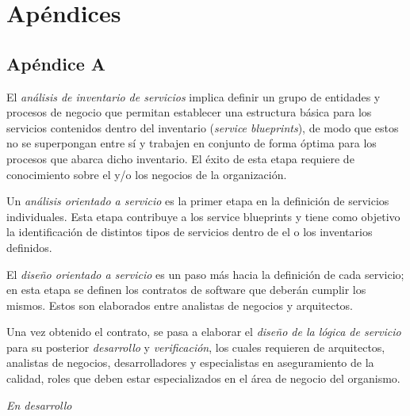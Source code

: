 \chapter{Apéndices}
  \label{Apendices}

  \section{Apéndice A}
    \label{Apendices:ApendiceA}
      El \emph{análisis de inventario de servicios} implica definir un grupo de entidades y procesos de negocio que permitan establecer una estructura básica para los servicios contenidos dentro del inventario (\emph{service blueprints}), de modo que estos no se superpongan entre sí y trabajen en conjunto de forma óptima para los procesos que abarca dicho inventario. El éxito de esta etapa requiere de conocimiento sobre el y/o los negocios de la organización.

      Un \emph{análisis orientado a servicio} es la primer etapa en la definición de servicios individuales. Esta etapa contribuye a los service blueprints y tiene como objetivo la identificación de distintos tipos de servicios dentro de el o los inventarios definidos.

      El \emph{diseño orientado a servicio} es un paso más hacia la definición de cada servicio; en esta etapa se definen los contratos de software que deberán cumplir los mismos. Estos son elaborados entre analistas de negocios y arquitectos.

      Una vez obtenido el contrato, se pasa a elaborar el \emph{diseño de la lógica de servicio} para su posterior \emph{desarrollo} y \emph{verificación}, los cuales requieren de arquitectos, analistas de negocios, desarrolladores y especialistas en aseguramiento de la calidad, roles que deben estar especializados en el área de negocio del organismo.

      \emph{En desarrollo}
